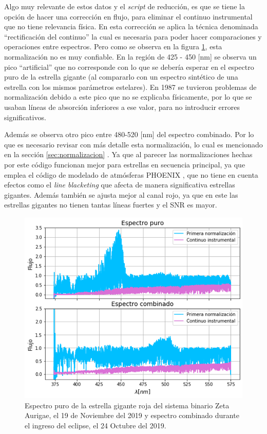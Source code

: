 \documentclass[12pt,oneside,openany,letter]{book}
\begin{document}
\noindent Algo muy relevante de estos datos y el \textit{script} de reducción, es que se tiene la opción de hacer una corrección en flujo, para eliminar el continuo instrumental que no tiene relevancia física. En esta corrección se aplica la técnica denominada “rectificación del continuo” la cual es necesaria para poder hacer comparaciones y operaciones entre espectros. Pero como se observa en la figura \ref{fig:espectro_puro}, esta normalización no es muy confiable. En la región de 425 - 450 [nm] se observa un pico  “artificial'' que no corresponde con lo que se debería esperar en el espectro puro de la estrella gigante (al compararlo con un espectro sintético de una estrella con los mismos parámetros estelares). En 1987 se tuvieron problemas de normalización debido a este pico que no se explicaba físicamente, por lo que se usaban líneas de absorción inferiores a ese valor, para no introducir errores significativos.

Además se observa otro pico entre 480-520 [nm] del espectro combinado. Por lo que es necesario revisar con más detalle esta normalización, lo cual es mencionado en la sección \ref{sec:normalizacion} . Ya que al parecer las normalizaciones hechas por este código funcionan mejor para estrellas en secuencia principal, ya que emplea el código de modelado de atmósferas PHOENIX \citep{husser2013new}, que no tiene en cuenta efectos como el \textit{line blacketing} que afecta de manera significativa estrellas gigantes. Además también se ajusta mejor al canal rojo, ya que en este las estrellas gigantes no tienen tantas líneas fuertes y el SNR es mayor.

\begin{figure}[h]
    \centering
    \includegraphics[width=0.9\linewidth]{Gaficas/primer_normal.png}
    \caption{Espectro puro de la estrella gigante roja del sistema binario Zeta Aurigae, el 19 de Noviembre del 2019 y espectro combinado durante el ingreso del eclipse, el 24 Octubre del 2019.}
    \label{fig:espectro_puro}
\end{figure}
\end{document}
